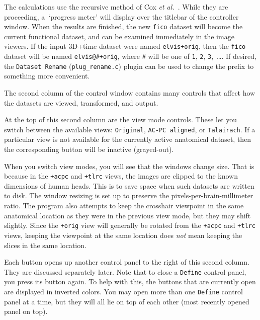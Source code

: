 \begin{description}
                       The calculations use the recursive method of Cox
                       {\it et al.}~\cite{Cox-Rtime}.  While they are
                       proceeding, a~`progress meter' will display
                       over the titlebar of the \afnit controller window.
                       When the results are finished, the new {\tt fico}
                       dataset will become the current functional
                       dataset, and can be examined immediately in
                       the image viewers.  If the input 3D+time dataset
                       were named {\tt elvis+orig}, then the {\tt fico}
                       dataset will be named {\tt elvis@\#+orig}, where
                       {\tt \#} will be one of {\tt 1}, {\tt 2}, {\tt 3},~\ldots.
                       If desired, the {\tt Dataset Rename} ({\tt plug\_rename.c})
                       plugin can be used to change the prefix to something more
                       convenient.
\end{description}

The second column of the \afnit control window contains many controls
that affect how the datasets are viewed, transformed, and output.

At the top of this second column are the view mode controls.  These
let you switch between the available views: {\tt Original},
{\tt AC-PC aligned}, or {\tt Talairach}.
If a particular view is not available for the currently active
anatomical dataset, then the corresponding button will be inactive (grayed-out).

When you switch view modes, you will see that the windows change size.
That is because in the {\tt +acpc} and {\tt +tlrc} views, the images are
clipped to the known dimensions of human heads.  This is to save space
when such datasets are written to disk.  The window resizing is set up to preserve
the pixels-per-brain-millimeter ratio.  The program also attempts to keep
the crosshair viewpoint
in the same anatomical location as they were in the previous view
mode, but they may shift slightly.  Since the {\tt +orig} view will
generally be rotated from the {\tt +acpc} and {\tt +tlrc} views, keeping
the viewpoint at the same location does {\it not\/} mean keeping the
slices in the same location.

Each  button opens up another control panel to the right
of this second column.  They are discussed separately later.  Note
that to close a {\tt Define} control panel, you press its button again.
To help with this, the  buttons that are currently open are
displayed in inverted colors.  You may open more than one {\tt Define} control
panel at a time, but they will all lie on top of each other (most recently opened
panel on top).

